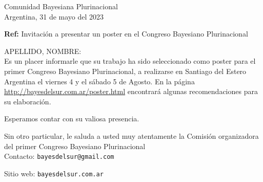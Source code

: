 \documentclass[a4paper,11pt]{article}
\begin{document}
\begin{flushright}
Comunidad Bayesiana Plurinacional \\
Argentina, 31 de mayo del 2023
\end{flushright} 

\vspace{1cm}
\noindent

\hfill \textbf{Ref:} Invitación a presentar un poster en el Congreso Bayesiano Plurinacional \\

\vspace{1cm}

\noindent APELLIDO, NOMBRE:\\

\indent Es un placer informarle que su trabajo ha sido seleccionado como poster para el primer Congreso Bayesiano Plurinacional, a realizarse en Santiago del Estero Argentina el viernes 4 y el sábado 5 de Agosto. En la página \url{http://bayesdelsur.com.ar/poster.html} encontrará algunas recomendaciones para su elaboración.

\vspace{0.3cm}

\indent Esperamos contar con su valiosa presencia.

\vspace{0.3cm}

\indent Sin otro particular, le saluda a usted muy atentamente la Comisión organizadora del primer Congreso Bayesiano Plurinacional\\

 \vspace{0.8cm}
\small
 Contacto: \texttt{bayesdelsur@gmail.com}

 Sitio web: \texttt{bayesdelsur.com.ar}
\end{document}
